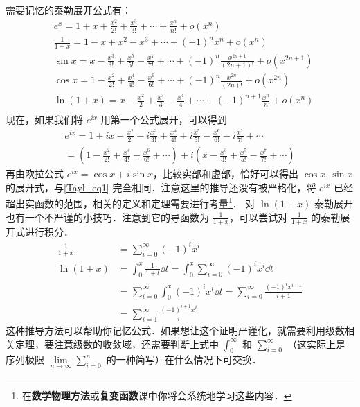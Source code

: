 需要记忆的泰勒展开公式有：
\begin{equation}\label{Tayl_eq1}
\begin{aligned}
&e^x=1+x+\frac{x^2}{2!}+\frac{x^3}{3!}+\cdots+\frac{x^n}{n!}+o(x^n)\\
&\frac{1}{1+x}=1-x+x^2-x^3+\cdots+(-1)^nx^n+o(x^n)\\
&\sin x=x-\frac{x^3}{3!}+\frac{x^5}{5!}-\frac{x^7}{7!}+\cdots+(-1)^n\frac{x^{2n+1}}{(2n+1)!}+o(x^{2n+1})\\
&\cos x=1-\frac{x^2}{2!}+\frac{x^4}{4!}-\frac{x^6}{6!}+\cdots+(-1)^n\frac{x^{2n}}{(2n)!}+o(x^{2n})\\
&\ln (1+x)=x-\frac{x^2}{2}+\frac{x^3}{3}-\frac{x^4}{4}+\cdots+(-1)^{n+1}\frac{x^n}{n}+o(x^n)\\
\end{aligned}
\end{equation}
现在，如果我们将 $e^{ix}$ 用第一个公式展开，可以得到
\begin{equation}
\begin{aligned}
e^{ix}=1+ix-\frac{x^2}{2!}-i\frac{x^3}{3!}+\frac{x^4}{4!}+i\frac{x^5}{5!}-\frac{x^6}{6!}-i\frac{x^7}{7!}+\cdots\\
=(1-\frac{x^2}{2!}+\frac{x^4}{4!}-\frac{x^6}{6!}+\cdots)+i(x-\frac{x^3}{3!}+\frac{x^5}{5!}-\frac{x^7}{7!}+\cdots)
\end{aligned}
\end{equation}
再由欧拉公式 $e^{ix}=\cos x+i\sin x$，比较实部和虚部，恰好可以得出 $\cos x,\sin x$ 的展开式，与\autoref{Tayl_eq1} 完全相同．注意这里的推导还没有被严格化，将 $e^{ix}$ 已经超出实函数的范围，相关的定义和定理需要进行考量\footnote{在\textbf{数学物理方法}或\textbf{复变函数}课中你将会系统地学习这些内容．}．
对 $\ln(1+x)$ 泰勒展开也有一个不严谨的小技巧．注意到它的导函数为 $\frac{1}{1+x}$，可以尝试对 $\frac{1}{1+x}$ 的泰勒展开式进行积分．
\begin{equation}
\begin{aligned}
\frac{1}{1+x}&=\sum_{i=0}^{\infty} (-1)^i x^i\\
\ln(1+x)&=\int_0^x \frac{1}{1+t}\dd t = \int_0^x \sum_{i=0}^{\infty} (-1)^i x^i\dd t \\
&= \sum_{i=0}^{\infty} \int_0^x(-1)^i x^i\dd t = \sum_{i=0}^{\infty} \frac{(-1)^i x^{i+1}}{i+1}\\
&= \sum_{i=1}^{\infty} \frac{(-1)^{i+1} x^{i}}{i}
\end{aligned}
\end{equation}
这种推导方法可以帮助你记忆公式．如果想让这个证明严谨化，就需要利用级数相关定理，要注意级数的收敛域，还需要判断上式中 $\int_0^{\infty}$ 和 $\sum_{i=0}^{\infty}$ （这实际上是序列极限 $\lim\limits_{n\rightarrow \infty} \sum_{i=0}^{n}$ 的一种简写）在什么情况下可交换．
